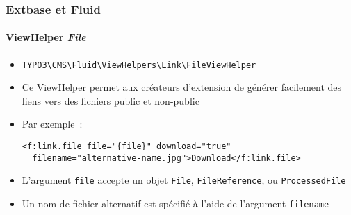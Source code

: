 %

\begin{frame}[fragile]
	\frametitle{Extbase et Fluid}
	\framesubtitle{ViewHelper \textit{File}}


	\begin{itemize}
		\item \begin{lstlisting}
TYPO3\CMS\Fluid\ViewHelpers\Link\FileViewHelper
\end{lstlisting}

		\item Ce ViewHelper permet aux créateurs d'extension de générer facilement des liens vers des fichiers
			public et non-public
		\item Par exemple~:

\begin{lstlisting}
<f:link.file file="{file}" download="true"
  filename="alternative-name.jpg">Download</f:link.file>
\end{lstlisting}

		\item L'argument \texttt{file} accepte
			un objet \texttt{File},
			\texttt{FileReference}, ou
			\texttt{ProcessedFile}
		\item Un nom de fichier alternatif est spécifié à l'aide de l'argument
			\texttt{filename}

	\end{itemize}

\end{frame}


